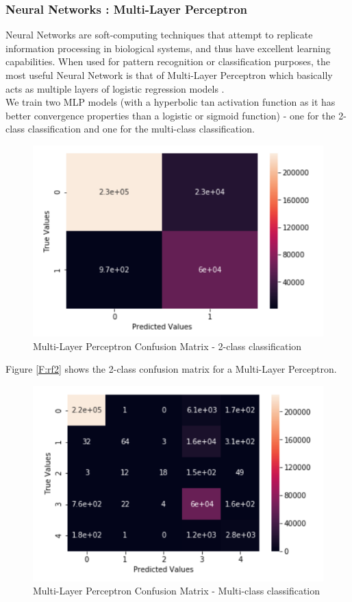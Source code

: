 \subsubsection{Neural Networks : Multi-Layer Perceptron}
Neural Networks are soft-computing techniques that attempt to replicate information processing in biological systems, and thus have excellent learning capabilities. When used for pattern recognition or classification purposes, the most useful Neural Network is that of Multi-Layer Perceptron which basically acts as multiple layers of logistic regression models \cite{bishop10}.\\
We train two MLP models (with a hyperbolic tan activation function as it has better convergence properties than a logistic or sigmoid function) - one for the 2-class classification and one for the multi-class classification. 
\begin{figure}
	\includegraphics[width=1.0\columnwidth]{images/nn2.PNG}
	\caption{Multi-Layer Perceptron Confusion Matrix - 2-class classification}
	\label{F:nn2}
\end{figure}
Figure \ref{F:rf2} shows the 2-class confusion matrix for a Multi-Layer Perceptron.
\begin{figure}
	\includegraphics[width=1.0\columnwidth]{images/nnall.PNG}
	\caption{Multi-Layer Perceptron Confusion Matrix - Multi-class classification}
	\label{F:nnall}
\end{figure}
